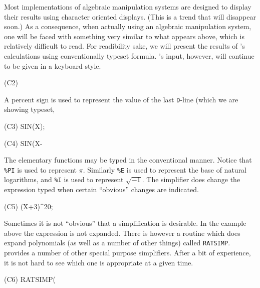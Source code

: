 Most implementations of algebraic manipulation systems are designed to
display their results using character oriented displays.  (This is a
trend that will disappear soon.)  As a consequence, when actually using an
algebraic manipulation system, one will be faced with something very similar to
what appears above, which is relatively difficult to read.  For
readibility sake, we will present the results of {\Macsyma}'s
calculations using conventionally typeset formula.  {\Macsyma}'s input, however, will continue to be
given in a keyboard style.

\begin{code}
(C2) %
\end{code}
A percent sign is used to represent the value of the last {\tt D}-line (which
we are showing typeset, 
\begin{code}
(C3) SIN(X);
\end{code}
\begin{code}
(C4) SIN(X-%
\end{code}
The elementary functions may be typed in the conventional manner.  Notice that
{\tt\%PI} is used to represent $\pi$.  Similarly {\tt\%E} is used to represent
the base of natural logarithms, and {\tt\%I} is used to represent $\sqrt{-1}$.
The simplifier does change the expression typed when certain ``obvious'' changes
are indicated.
\begin{code}
(C5) (X+3)^20;
\end{code}
Sometimes it is not ``obvious'' that a simplification is desirable.
In the example above the expression is not expanded.  There is however
a routine which does expand polynomials (as well as a number of other
things) called {\tt RATSIMP}.  {\Macsyma} provides a number of other
special purpose simplifiers. After a bit of experience, it is not hard
to see which one is appropriate at a given time.
\begin{code}
(C6) RATSIMP(%
\end{code}

